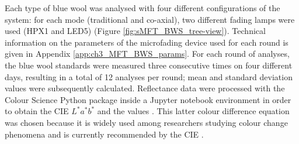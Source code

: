 Each type of blue wool was analysed with four different configurations of the system: for each mode (traditional and co-axial), two different fading lamps were used (HPX1 and LED5) (Figure \ref{fig:sMFT_BWS_tree-view}). Technical information on the parameters of the microfading device used for each round is given in Appendix \ref{app:ch3_MFT_BWS_params}. For each round of analyses, the blue wool standards were measured three consecutive times on four different days, resulting in a total of 12 analyses per round; mean and standard deviation values were subsequently calculated. Reflectance data were processed with the Colour Science Python package \citep{mansencal_colour_2022} inside a Jupyter notebook environment \citep{harris_array_2020, kluyver_jupyter_2016, mckinney_data_2010, hunter_matplotlib_2007} in order to obtain the CIE $L^*a^*b^*$ and the \dEOO values \citep{luo_development_2001}. This latter colour difference equation was chosen because it is widely used among researchers studying colour change phenomena and is currently recommended by the \gls{CIE} \citep{cie_technical_committee_1-55_recommended_2016}.\\


